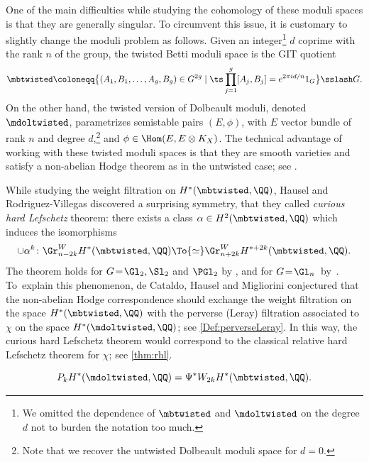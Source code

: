 One of the main difficulties while studying the cohomology of these moduli spaces is that they are generally singular. To circumvent this issue, it is customary to slightly change the moduli problem as follows. Given an integer\footnote{We omitted the dependence of $\mbtwisted$ and $\mdoltwisted$ on the degree $d$ not to burden the notation too much.} $d$ coprime with the rank $n$ of the group, the twisted Betti moduli space is the GIT quotient
\[
\mbtwisted \coloneqq
\big\{ (A_1, B_1, \ldots, A_{g}, B_{g}) \in G^{2g} \mid \ts \prod^{g}_{j=1}[A_j, B_j]=e^{2\pi id/n}1_{G} \big\}\sslash G.
\]
On the other hand, the twisted version of Dolbeault moduli, denoted $\mdoltwisted$, parametrizes semistable pairs $(E, \phi)$, with $E$ vector bundle of rank $n$ and degree $d$,\footnote{Note that we recover the untwisted Dolbeault moduli space for $d=0$.} and $\phi \in \Hom(E, E \otimes K_X)$. The technical advantage of working with these twisted moduli spaces is that they are smooth varieties and satisfy a non-abelian Hodge theorem as in the untwisted case; see \cite{HauselThaddeus04}.

While studying the weight filtration on $H^*(\mbtwisted, \QQ)$, Hausel and Rodriguez-Villegas discovered a surprising symmetry, that they called \emph{curious hard Lefschetz} theorem: there exists a class $\alpha\in H^2(\mbtwisted, \QQ)$ which induces the isomorphisms%
\begin{equation}\label{cHL}
\cup {\alpha^k}\colon \Gr^W_{n-2k}H^*(\mbtwisted, \QQ)\To{\simeq} \Gr^W_{n+2k}H^{*+2k}(\mbtwisted, \QQ).
\end{equation}
The theorem holds for $G\!=\!\Gl_2, \Sl_2$ and $\PGl_2$ by \cite{HauselRodriguez-Villegas2008}, and for $G\!=\!\Gl_n$~by~\cite{Mellit2019}.
To~explain this phenomenon, de Cataldo, Hausel and Migliorini conjectured that the non-abelian Hodge correspondence should exchange the weight filtration on the space $H^*(\mbtwisted, \QQ)$ with the perverse (Leray) filtration associated to $\chi$ on the space $H^*(\mdoltwisted, \QQ)$; see \cref{Def:perverseLeray}. In this way, the curious hard Lefschetz theorem would correspond to the classical relative hard Lefschetz theorem for $\chi$; see \cref{thm:rhl}.

\skpt
\begin{conj}[P=W conjecture for twisted moduli spaces]
\mbox{}\vspace*{-.7\baselineskip}
\[
P_k H^*(\mdoltwisted, \QQ) = \Psi^* W_{2k}H^*(\mbtwisted, \QQ).
\]
\end{conj}

